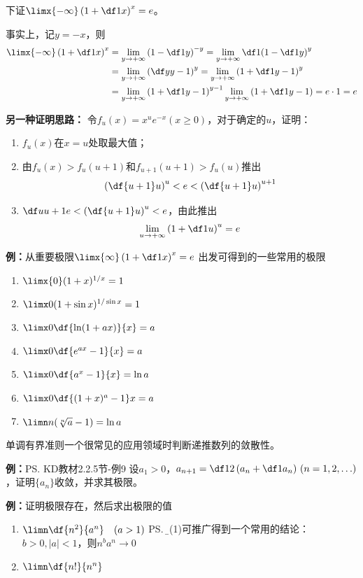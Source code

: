 下证$\limx{-\infty}\left(1+\df1x\right)^x=e$。

事实上，记$y=-x$，则
\begin{align*}
	\limx{-\infty}\left(1+\df1x\right)^x
	&=\lim\limits_{y\to+\infty}\left(1-\df1y\right)^{-y}
	=\lim\limits_{y\to+\infty}\df1{\left(1-\df1y\right)^{y}}\\
	&=\lim\limits_{y\to+\infty}\left(\df y{y-1}\right)^{y}
	=\lim\limits_{y\to+\infty}\left(1+\df1{y-1}\right)^{y}\\
	&=\lim\limits_{y\to+\infty}\left(1+\df1{y-1}\right)^{y-1}
	\lim\limits_{y\to+\infty}\left(1+\df1{y-1}\right)=e\cdot1=e
\end{align*}

\begin{shaded}
{\bf 另一种证明思路：}
令$f_u(x)=x^ue^{-x}(x\geq 0)$，对于确定的$u$，证明：
\begin{enumerate}[(1)]
  \setlength{\itemindent}{1cm}
  \item $f_u(x)$在$x=u$处取最大值；
  \item 由$f_u(x)>f_u(u+1)$和$f_{u+1}(u+1)>f_u(u)$推出
  $$\left(\df{u+1}u\right)^u<e<\left(\df{u+1}u\right)^{u+1}$$
  \item $\df u{u+1}e<\left(\df{u+1}u\right)^u<e$，由此推出
  $$\lim\limits_{u\to+\infty}\left(1+\df 1u\right)^u=e$$
\end{enumerate}
\end{shaded}

{\b{\bf 例：}从重要极限$\limx{\infty}\left(1+\df1x\right)^x=e$
出发可得到的一些常用的极限
\begin{enumerate}[(1)]
  \setlength{\itemindent}{1cm}
  \item $\limx{0}(1+x)^{1/x}=1$ 
  \item $\limx 0(1+\sin x)^{1/\sin x}=1$ 
  \item $\limx 0\df{\ln(1+ax)}{x}=a$
  \item $\limx 0\df{e^{ax}-1}{x}=a$ 
  \item $\limx 0\df{a^x-1}{x}=\ln a$ 
  \item $\limx 0\df{(1+x)^a-1}x=a$
  \item $\limn n(\sqrt[n]{a}-1)=\ln a$ 
\end{enumerate}}

单调有界准则一个很常见的应用领域时判断递推数列的敛散性。

{\bf 例：}\ps{KD教材2.2.5节-例9}
设$a_1>0$，$a_{n+1}=\df 12\left(a_n+\df 1{a_n}\right)\,
(n=1,2,\ldots)$，证明$\{a_n\}$收敛，并求其极限。

{\bf 例：}证明极限存在，然后求出极限的值
\begin{enumerate}[(1)]
  \setlength{\itemindent}{1cm}
  \item $\limn\df{n^2}{a^n}\quad (a>1)$%
  \ps{\b 由(1)可推广得到一个常用的结论：$b>0,|a|<1$，则$n^ba^n\to 0$}
  \item $\limn\df{n!}{n^n}$%
\end{enumerate}

